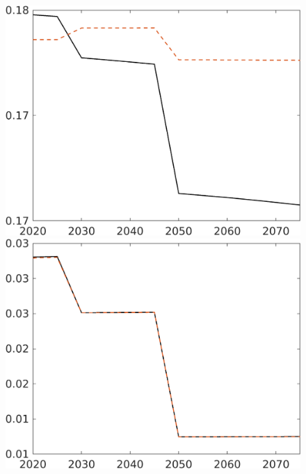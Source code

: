 \begin{figure}[h!!]
\begin{minipage}[]{0.32\textwidth}
	\end{minipage}
\begin{minipage}[]{0.32\textwidth}
	\includegraphics[width=1\textwidth]{../../codding_model/own_basedOnFried/optimalPol_elastS_DisuSci/figures/all_1705/comp_notaul_OPT_T_NoTaus_Ln_spillover0_sep1_BN0_ineq0_etaa0.79.png}
\end{minipage}
\begin{minipage}[]{0.32\textwidth}
	\includegraphics[width=1\textwidth]{../../codding_model/own_basedOnFried/optimalPol_elastS_DisuSci/figures/all_1705/comp_notaul_OPT_T_NoTaus_sff_spillover0_sep1_BN0_ineq0_etaa0.79.png}

\end{minipage}
\end{figure}
